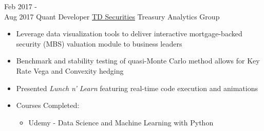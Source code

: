 \documentclass[letterpaper]{twentysecondcv} %
\begin{document}
\begin{twenty}
	\twentyitem
    	{Feb 2017 - \\ Aug 2017}
        {Quant Developer}
        {\href{https://www.tdsecurities.com}{TD Securities}}
        {Treasury Analytics Group}
        {%
	        \item{}
    	    \item{}
    	    \item{}
    	    \item
        	\item{}
        	\item
        	\item{}
        }
        {
     \begin{itemize}
		\item Leverage data visualization tools to deliver interactive mortgage-backed security (MBS) valuation module to business leaders
        \item Benchmark and stability testing of quasi-Monte Carlo method allows for Key Rate Vega and Convexity hedging   
        \item Presented \emph{Lunch n' Learn} featuring real-time code execution and animations
        \item Courses Completed: 
        \begin{itemize}
        	\item Udemy - Data Science and Machine Learning with Python
        \end{itemize}
    \end{itemize}}
     

\end{twenty}
\end{document}
